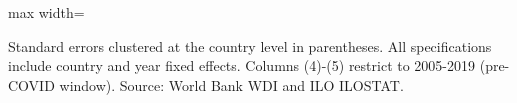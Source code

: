 \begin{table}[htbp]
\begin{adjustbox}{max width=\textwidth}
   \end{adjustbox}

   \par \raggedright 
   Standard errors clustered at the country level in parentheses. All specifications include country and year fixed effects. Columns (4)-(5) restrict to 2005-2019 (pre-COVID window). Source: World Bank WDI and ILO ILOSTAT.
\end{table}


